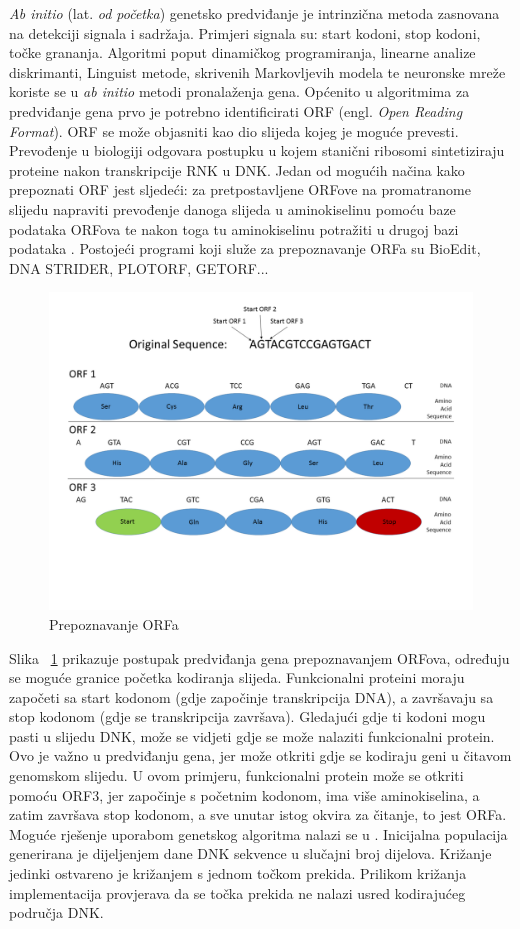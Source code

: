 \documentclass[times, utf8, zavrsni, numeric]{fer}
\begin{document}
\textit{Ab initio} (lat. \textit{od početka}) genetsko predviđanje je intrinzična metoda zasnovana na detekciji signala i sadržaja. Primjeri signala su: start kodoni, stop kodoni, točke grananja. Algoritmi poput dinamičkog programiranja, linearne analize diskrimanti, Linguist metode, skrivenih Markovljevih modela te neuronske mreže koriste se u \textit{ab initio} metodi pronalaženja gena. 
 Općenito u algoritmima za predviđanje gena prvo je potrebno identificirati ORF (engl. \textit{Open Reading Format}). ORF se može objasniti kao dio slijeda kojeg je moguće prevesti. Prevođenje u biologiji odgovara postupku u kojem stanični ribosomi sintetiziraju proteine nakon transkripcije RNK u DNK. Jedan od mogućih načina kako prepoznati ORF jest sljedeći: za pretpostavljene ORFove na promatranome slijedu napraviti prevođenje danoga slijeda u aminokiselinu pomoću baze podataka ORFova te nakon toga tu aminokiselinu potražiti u drugoj bazi podataka \cite{applicationOfBioinformatics}. Postojeći programi koji služe za prepoznavanje ORFa su BioEdit, DNA STRIDER, PLOTORF, GETORF... 
\begin{figure}[htb]
	\includegraphics[width=\linewidth]{slike/ORF.PNG}
	\centering
	\caption{Prepoznavanje ORFa \cite{wikiORF}}
	\label{fig:prepoznavanjeORF}
\end{figure}
Slika ~\ref{fig:prepoznavanjeORF} prikazuje postupak predviđanja gena prepoznavanjem ORFova, određuju se moguće granice početka kodiranja slijeda. Funkcionalni proteini moraju započeti sa start kodonom (gdje započinje transkripcija DNA), a završavaju sa stop kodonom (gdje se transkripcija završava). Gledajući gdje ti kodoni mogu pasti u slijedu DNK, može se vidjeti gdje se može nalaziti funkcionalni protein. Ovo je važno u predviđanju gena, jer može otkriti gdje se kodiraju geni u čitavom genomskom slijedu. U ovom primjeru, funkcionalni protein može se otkriti pomoću ORF3, jer započinje s početnim kodonom, ima više aminokiselina, a zatim završava stop kodonom, a sve unutar istog okvira za čitanje, to jest ORFa.
Moguće rješenje uporabom genetskog algoritma nalazi se u \cite{applicationOfBioinformatics}.   
Inicijalna populacija generirana je dijeljenjem dane DNK sekvence u slučajni broj dijelova. Križanje jedinki ostvareno je križanjem s jednom točkom prekida. Prilikom križanja implementacija provjerava da se točka prekida ne nalazi usred kodirajućeg područja DNK.
\end{document}
